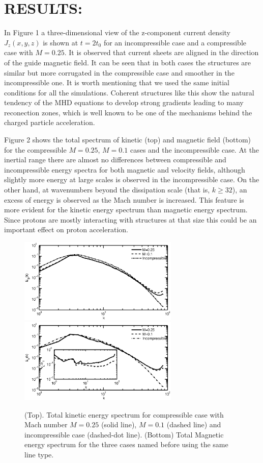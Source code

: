 \documentclass[%
aip,pop,amsmath,amssymb,
 reprint,%
]{revtex4-1}
\begin{document}
\section{\label{sec:level3}RESULTS:}

In Figure 1
a three-dimensional view of the z-component current density $J_z(x,y,z)$
is shown at
$t=2t_0$ for an incompressible case and a compressible case with $M=0.25$.
It is 
observed that current sheets are aligned in the direction of 
the guide magnetic field. 
It can be seen that in both cases the structures are similar 
but more corrugated in the 
compressible case and smoother in the incompressible one. It is worth
mentioning that we used the same 
initial conditions for all the simulations. 
Coherent structures like
this show the natural tendency of the MHD equations to 
develop strong gradients
leading to many reconection zones, which
is well known to be one of the mechanisms behind the charged particle
acceleration.

Figure 2 shows the total spectrum of kinetic (top) and magnetic field (bottom) 
for 
the compressible $M=0.25$, $M=0.1$ cases and the
incompressible case. At the inertial range
there are almost no differences between compressible and incompressible 
energy spectra for 
both magnetic and velocity fields, although slightly more energy at 
large scales is observed in the incompressible case.
On the other hand, at wavenumbers beyond the dissipation scale 
(that is, $k\geq32$),  an excess of energy is observed 
as the Mach number is increased.  
This feature is more evident for the kinetic energy spectrum
than magnetic energy spectrum. Since protons 
are mostly interacting with structures at that size this could be an 
important effect on proton acceleration.


\begin{figure}[h!]
\begin{center}
{\includegraphics[width = 3in]{./Figures/Fig2_b}}\\
{\includegraphics[width = 3in]{./Figures/Fig2_a}}
\caption{(Top). Total kinetic energy spectrum for compressible case with Mach 
number $M=0.25$ (solid line), $M=0.1$ (dashed line) and incompressible case 
(dashed-dot line).
(Bottom) Total Magnetic energy spectrum for the three cases named 
before using the same line 
type.}
\end{center}
\label{mean square velocity}
\end{figure}
\end{document}
